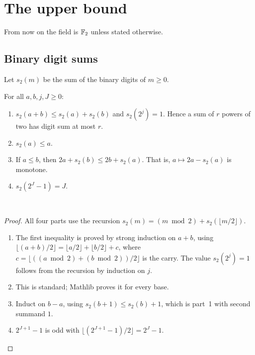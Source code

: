 \section{The upper bound}\label{sec:upper}

From now on the field is \(\mathbb F_2\) unless stated otherwise.

\subsection{Binary digit sums}

Let \(s_2(m)\) be the sum of the binary digits of \(m\ge0\).

\begin{lemma}\label{lem:digits}
For all \(a,b,j,J\ge0\):
\begin{enumerate}
 \item \(s_2(a+b)\le s_2(a)+s_2(b)\) and \(s_2(2^j)=1\). Hence a sum of \(r\)
 powers of two has digit sum at most \(r\).
 \item \(s_2(a)\le a\).
 \item If \(a\le b\), then \(2a+s_2(b)\le2b+s_2(a)\). That is,
 \(a\mapsto2a-s_2(a)\) is monotone.
 \item \(s_2(2^J-1)=J\).
\end{enumerate}
\textnormal{\small{}\,}
\end{lemma}

\begin{proof}
All four parts use the recursion \(s_2(m)=(m\bmod2)+s_2(\lfloor m/2\rfloor)\).
\begin{enumerate}
 \item The first inequality is proved by strong induction on \(a+b\), using
 \(\lfloor(a+b)/2\rfloor=\lfloor a/2\rfloor+\lfloor b/2\rfloor+c\), where
 \(c=\lfloor((a\bmod2)+(b\bmod2))/2\rfloor\) is the carry. The value
 \(s_2(2^j)=1\) follows from the recursion by induction on \(j\).
 \item This is standard; Mathlib proves it for every base.
 \item Induct on \(b-a\), using \(s_2(b+1)\le s_2(b)+1\), which is part~1 with
 second summand \(1\).
 \item \(2^{J+1}-1\) is odd with \(\lfloor(2^{J+1}-1)/2\rfloor=2^J-1\). \qedhere
\end{enumerate}
\end{proof}

